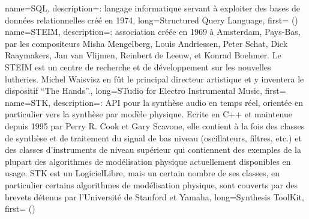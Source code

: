 {
    name={SQL},
    description={\textit{}: langage informatique servant à exploiter des bases de données relationnelles créé en 1974},
    long={Structured Query Language},
    first={ ()}
}
{
    name={STEIM},
    description={\textit{}: association créée en 1969 à Amsterdam, Pays-Bas, par les compositeurs Misha Mengelberg, Louis Andriessen, Peter Schat, Dick Raaymakers, Jan van Vlijmen, Reinbert de Leeuw, et Konrad Boehmer. Le STEIM est un centre de recherche et de développement sur les nouvelles lutheries. Michel Waisvisz en fût le principal directeur artistique et y inventera le dispositif ``The Hands''.},
    long={STudio for Electro Instrumental Music},
    first={}
}
{
    name={STK},
    description={\textit{}: \gls{API} pour la synthèse audio en temps réel, orientée en particulier vers la synthèse par modèle physique. Ecrite en C++ et maintenue depuis 1995 par Perry R. Cook et Gary Scavone, elle contient à la fois des classes de synthèse et de traitement du signal de bas niveau (oscillateurs, filtres, etc.) et des classes d'instruments de niveau supérieur qui contiennent des exemples de la plupart des algorithmes de modélisation physique actuellement disponibles en usage. STK est un \gls{LogicielLibre}, mais un certain nombre de ses classes, en particulier certains algorithmes de modélisation physique, sont couverts par des brevets détenus par l'Université de Stanford et Yamaha},
    long={Synthesis ToolKit},
    first={ ()}
}


